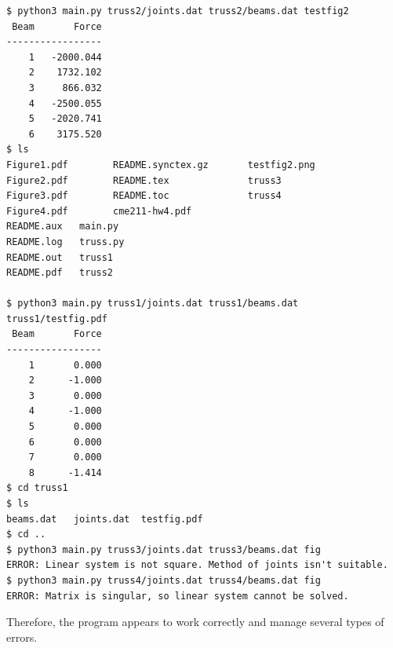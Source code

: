 \documentclass[11pt]{amsart}
\theoremstyle{definition}
\begin{document}
\begin{Verbatim}[fontsize=\small]
$ python3 main.py truss2/joints.dat truss2/beams.dat testfig2
 Beam       Force
-----------------
    1   -2000.044
    2    1732.102
    3     866.032
    4   -2500.055
    5   -2020.741
    6    3175.520
$ ls
Figure1.pdf        README.synctex.gz       testfig2.png
Figure2.pdf        README.tex              truss3
Figure3.pdf        README.toc              truss4
Figure4.pdf        cme211-hw4.pdf	
README.aux	 main.py		
README.log	 truss.py	
README.out	 truss1
README.pdf	 truss2

$ python3 main.py truss1/joints.dat truss1/beams.dat truss1/testfig.pdf
 Beam       Force
-----------------
    1       0.000
    2      -1.000
    3       0.000
    4      -1.000
    5       0.000
    6       0.000
    7       0.000
    8      -1.414
$ cd truss1
$ ls
beams.dat	joints.dat	testfig.pdf
$ cd ..
$ python3 main.py truss3/joints.dat truss3/beams.dat fig
ERROR: Linear system is not square. Method of joints isn't suitable.
$ python3 main.py truss4/joints.dat truss4/beams.dat fig
ERROR: Matrix is singular, so linear system cannot be solved.
\end{Verbatim}
Therefore, the program appears to work correctly and manage several types of errors.
\end{document}
